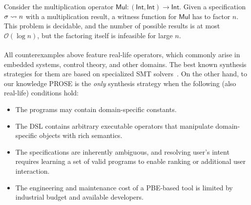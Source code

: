 Consider the multiplication operator $\mathsf{Mul}\colon (\mathsf{Int}, \mathsf{Int}) \to \mathsf{Int}$.
Given a specification $\sigma \rightsquigarrow n$ with a multiplication result, a witness function for $\mathsf{Mul}$
has to factor $n$.
This problem is decidable, and the number of possible results is at most $\mathcal{O}(\log n)$, but the factoring itself
is infeasible for large $n$.

\paragraph{}
\indent All counterexamples above feature real-life operators, which commonly arise in embedded systems, control theory,
and other domains.
The best known synthesis strategies for them are based on specialized SMT solvers~\cite{sygus}.
On the other hand, to our knowledge PROSE is the \emph{only} synthesis strategy when the following (also real-life)
conditions hold:
\begin{itemize}[nosep]
    \item The programs may contain domain-specific constants.
    \item The DSL contains arbitrary executable operators that manipulate domain-specific objects with rich semantics.
    \item The specifications are inherently ambiguous, and resolving user's intent requires learning a set of valid
        programs to enable ranking or additional user interaction.
    \item The engineering and maintenance cost of a PBE\hyp{}based tool is limited by industrial budget and available
        developers.
\end{itemize}

